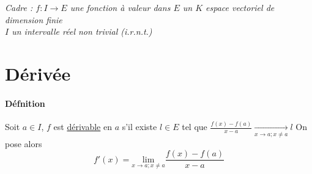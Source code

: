 
\textit{Cadre : $f:I\rightarrow E$ une fonction à valeur dans $E$ un $K$ espace vectoriel de dimension finie
\\\hspace*{2.5cm} $I$ un intervalle réel non trivial (i.r.n.t.)}
\minitoc	
\section{Dérivée}
    \traitd
    \paragraph{Défnition}
        Soit $a\in I$, $f$ est \underline{dérivable} en $a$ s'il existe $l\in E$ tel que $\frac{f(x) - f(a)}{x-a}
        \underset{x\rightarrow a ; x\neq a}{\longrightarrow} l$ On pose alors \vspace*{-0.5cm}
        \[f'(x) = \underset{x\rightarrow a ; x\neq a}{\mathrm{lim}} \frac{f(x) - f(a)}{x-a}\] \vspace*{-0.6cm}\trait \vspace*{-0.9cm}
